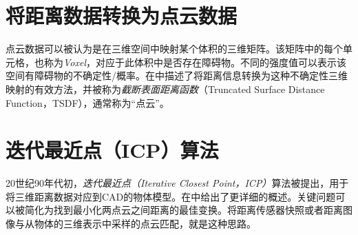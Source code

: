 
\section{将距离数据转换为点云数据}
点云数据可以被认为是在三维空间中映射某个体积的三维矩阵。该矩阵中的每个单元格，也称为\emph{Voxel}，对应于此体积中是否存在障碍物。不同的强度值可以表示该空间有障碍物的不确定性/概率。在\cite{curless96}中描述了将距离信息转换为这种不确定性三维映射的有效方法，并被称为\emph{截断表面距离函数}（Truncated Surface Distance Function，TSDF），通常称为“点云”。


\section {迭代最近点（ICP）算法}
20世纪90年代初，\emph{迭代最近点（Iterative Closest Point，ICP）}算法被提出，用于将三维距离数据对应到CAD的物体模型。在\cite{rusinkiewicz01}中给出了更详细的概述。关键问题可以被简化为找到最小化两点云之间距离的最佳变换。将距离传感器快照或者距离图像与从物体的三维表示中采样的点云匹配，就是这种思路。

